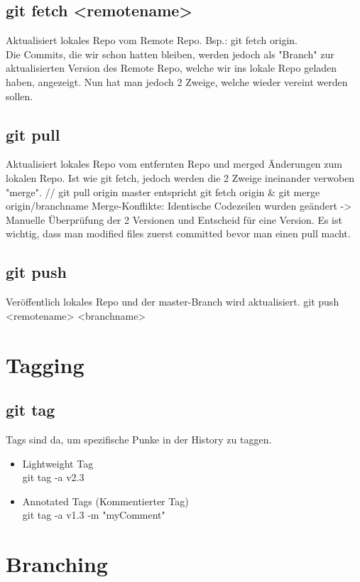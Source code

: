 \subsection{git fetch <remotename>}
Aktualisiert lokales Repo vom Remote Repo. Bsp.: git fetch origin. \\
Die Commits, die wir schon hatten bleiben, werden jedoch als "Branch" zur aktualisierten Version des Remote Repo, welche wir ins lokale Repo geladen haben, angezeigt. Nun hat man jedoch 2 Zweige, welche wieder vereint werden sollen. 

\subsection{git pull}
Aktualisiert lokales Repo vom entfernten Repo und merged Änderungen zum lokalen Repo. 
Ist wie git fetch, jedoch werden die 2 Zweige ineinander verwoben "merge". //
git pull origin master entspricht git fetch origin \& git merge origin/branchname
Merge-Konflikte: Identische Codezeilen wurden geändert -> Manuelle Überprüfung der 2 Versionen und Entscheid für eine Version. 
Es ist wichtig, dass man modified files zuerst committed bevor man einen pull macht.

\subsection{git push}
Veröffentlich lokales Repo und der master-Branch wird aktualisiert. 
git push <remotename> <branchname>


\section{Tagging}

\subsection{git tag}
Tags sind da, um spezifische Punke in der History zu taggen.

\begin{itemize}
	\item Lightweight Tag \\
	git tag -a v2.3
	\item Annotated Tags (Kommentierter Tag) \\
	git tag -a v1.3 -m "myComment"
\end{itemize}

\section{Branching}

